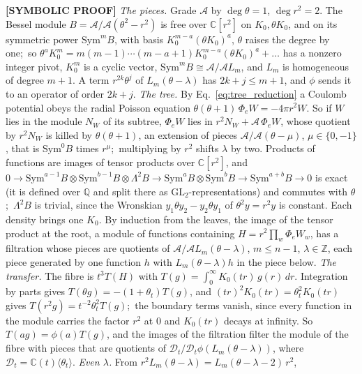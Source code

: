 \documentclass[aps,pra,twocolumn,superscriptaddress,longbibliography]{revtex4-2}
\begin{document}
\textbf{[SYMBOLIC PROOF]} \emph{The pieces.}  Grade $\mathcal{A}$ by
$\deg\theta=1$, $\deg r^2=2$.  The Bessel module
$B=\mathcal{A}/\mathcal{A}(\theta^2-r^2)$ is free over $\mathbb{C}[r^2]$ on
$K_0,\theta K_0$, and on its symmetric power $\mathrm{Sym}^mB$, with basis
$K_0^{m-a}(\theta K_0)^a$, $\theta$ raises the degree by one;\ so
$\theta^a K_0^m=m(m-1)\cdots(m-a+1)K_0^{m-a}(\theta K_0)^a+\dots$ has a nonzero
integer pivot, $K_0^m$ is a cyclic vector,
$\mathrm{Sym}^mB\cong\mathcal{A}/\mathcal{A}L_m$, and $L_m$ is homogeneous of
degree $m+1$.  A term $r^{2k}\theta^j$ of $L_m(\theta-\lambda)$ has $2k+j\le
m+1$, and $\phi$ sends it to an operator of order $2k+j$.  \emph{The tree.}
By Eq.~\eqref{eq:tree_reduction} a Coulomb potential obeys the radial
Poisson equation $\theta(\theta+1)\,\Phi_eW=-4\pi r^2W$.  So if $W$ lies in
the module $N_W$ of its subtree, $\Phi_eW$ lies in
$r^2N_W+\mathcal{A}\,\Phi_eW$, whose quotient by $r^2N_W$ is killed by
$\theta(\theta+1)$, an extension of pieces
$\mathcal{A}/\mathcal{A}(\theta-\mu)$, $\mu\in\{0,-1\}$, that is
$\mathrm{Sym}^0B$ times $r^{\mu}$;\ multiplying by $r^2$ shifts $\lambda$ by
two.  Products of functions are images of tensor
products over $\mathbb{C}[r^2]$, and
$0\to\mathrm{Sym}^{a-1}B\otimes\mathrm{Sym}^{b-1}B\otimes\Lambda^2B\to\mathrm{Sym}^aB\otimes\mathrm{Sym}^bB\to\mathrm{Sym}^{a+b}B\to0$
is exact (it is defined over $\mathbb{Q}$ and split there as
$\mathrm{GL}_2$-representations) and commutes with
$\theta$;\ $\Lambda^2B$ is trivial, since the Wronskian
$y_1\theta y_2-y_2\theta y_1$ of $\theta^2y=r^2y$ is constant.  Each density
brings one $K_0$.  By induction from the leaves, the image of the tensor product at
the root, a module of functions containing $H=r^2\prod_w\Phi_{e}W_w$, has a
filtration whose pieces are quotients of
$\mathcal{A}/\mathcal{A}L_m(\theta-\lambda)$, $m\le n-1$, $\lambda\in\mathbb{Z}$,
each piece generated by one function $h$ with $L_m(\theta-\lambda)h$ in the
piece below.  \emph{The transfer.}  The fibre is $t^3T(H)$ with
$T(g)=\int_0^\infty K_0(tr)\,g(r)\,dr$.  Integration by parts gives
$T(\theta g)=-(1+\theta_t)T(g)$, and $(tr)^2K_0(tr)=\theta_t^2K_0(tr)$ gives
$T(r^2g)=t^{-2}\theta_t^2T(g)$;\ the boundary terms vanish, since every
function in the module carries the factor $r^2$ at $0$ and $K_0(tr)$ decays at
infinity.  So $T(ag)=\phi(a)T(g)$, and the images of the filtration filter
the module of the fibre with pieces that are quotients of
$\mathcal{D}_t/\mathcal{D}_t\phi(L_m(\theta-\lambda))$, where
$\mathcal{D}_t=\mathbb{C}(t)\langle\theta_t\rangle$.  \emph{Even $\lambda$.}
From $r^2L_m(\theta-\lambda)=L_m(\theta-\lambda-2)\,r^2$,
\end{document}
